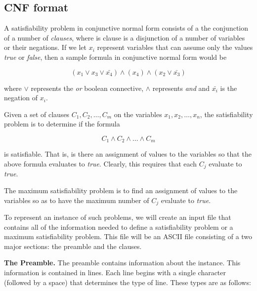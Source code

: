 \documentclass[12pt]{article}
\begin{document}
\subsection{CNF format}

A satisfiability problem in conjunctive normal form consists of a the
conjunction of a number of {\it clauses}, where is clause is a
disjunction of a number of variables or their negations.  If we let
$x_i$ represent variables that can assume only the values {\it true}
or {\it false}, then a sample formula in conjunctive normal form would
be

$$(x_1\vee x_3\vee \bar{x_4})\wedge (x_4)\wedge (x_2\vee \bar{x_3})$$

\noindent where $\vee$ represents the {\it or} boolean connective,
$\wedge$ represents {\it and} and $\bar{x_i}$ is the negation of
$x_i$.

Given a set of clauses $C_1, C_2,\ldots, C_m$ on the variables $x_1,
x_2, \ldots, x_n$, the satisfiability problem is to determine if the
formula

$$C_1\wedge C_2\wedge\ldots\wedge C_m$$

\noindent is satisfiable.  That is, is there an assignment of values to the
variables so that the above formula evaluates to {\it true}.  Clearly,
this requires that each $C_j$ evaluate to {\it true}.

The maximum satisfiability problem is to find an assignment of values
to the variables so as to have the maximum number of $C_j$ evaluate to
{\it true}.

To represent an instance of such problems, we will create an input
file that contains all of the information needed to define a
satisfiability problem or a maximum satisfiability problem.  This file
will be an ASCII file consisting of a two major sections:  the
preamble and the clauses.

{\bf The Preamble.} The preamble contains information about the
instance.  This information is contained in lines.  Each line begins
with a single character (followed by a space) that determines the type
of line.  These types are as follows:
\end{document}

